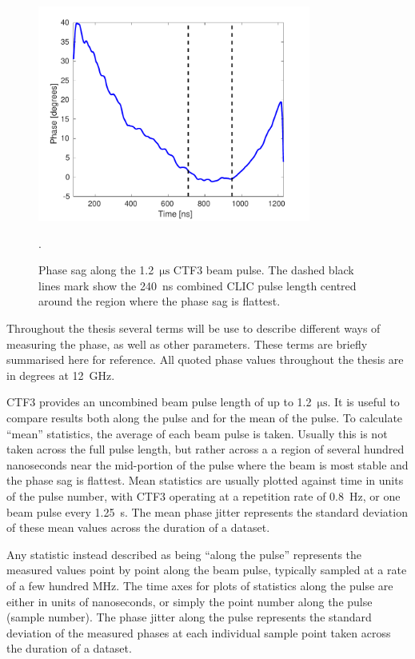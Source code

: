 \begin{figure}
  \centering
  \includegraphics[width=0.8\textwidth]{Figures/introduction/phaseSag}
  \caption{Phase sag along the 1.2~\(\mathrm{\mu s}\) CTF3 beam pulse. The dashed black lines mark show the 240~ns combined CLIC pulse length centred around the region where the phase sag is flattest.}.
  \label{f:ctfPhaseSag}
\end{figure}


Throughout the thesis several terms will be use to describe different ways of measuring the phase, as well as other parameters. These terms are briefly summarised here for reference. All quoted phase values throughout the thesis are in degrees at 12~GHz.

CTF3 provides an uncombined beam pulse length of up to 1.2~\(\mathrm{\mu s}\). It is useful to compare results both along the pulse and for the mean of the pulse. To calculate ``mean'' statistics, the average of each beam pulse is taken. Usually this is not taken across the full pulse length, but rather across a a region of several hundred nanoseconds near the mid-portion of the pulse where the beam is most stable and the phase sag is flattest. Mean statistics are usually plotted against time in units of the pulse number, with CTF3 operating at a repetition rate of 0.8~Hz, or one beam pulse every 1.25~s. The mean phase jitter represents the standard deviation of these mean values across the duration of a dataset.

Any statistic instead described as being ``along the pulse'' represents the measured values point by point along the beam pulse, typically sampled at a rate of a few hundred MHz. The time axes for plots of statistics along the pulse are either in units of nanoseconds, or simply the point number along the pulse (sample number). The phase jitter along the pulse represents the standard deviation of the measured phases at each individual sample point taken across the duration of a dataset.

